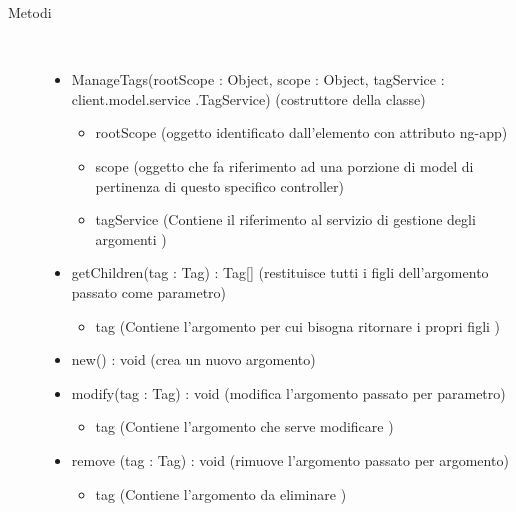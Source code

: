 \begin{description}
\item[Metodi] \hfill \\
 \vspace{-7mm}
\begin{itemize}
\item ManageTags(rootScope : Object, scope : Object, tagService : client.model.service .TagService) (costruttore della classe)\begin{itemize}
\item rootScope (oggetto identificato dall’elemento con attributo ng-app)
\item scope (oggetto che fa riferimento ad una porzione di model di pertinenza di questo specifico controller)
\item tagService (Contiene il riferimento al servizio di gestione degli argomenti )
\end{itemize}

\item getChildren(tag : Tag) : Tag[] (restituisce tutti i figli dell'argomento passato come parametro)\begin{itemize}
\item tag (Contiene l'argomento per cui bisogna ritornare i propri figli )
\end{itemize}

\item new() : void (crea un nuovo argomento)
\item modify(tag : Tag) : void (modifica l'argomento passato per parametro)\begin{itemize}
\item tag (Contiene l'argomento che serve modificare )
\end{itemize}

\item remove (tag : Tag) : void (rimuove l'argomento passato per argomento)\begin{itemize}
\item tag (Contiene l'argomento da eliminare )
\end{itemize}

\end{itemize}

\end{description}

